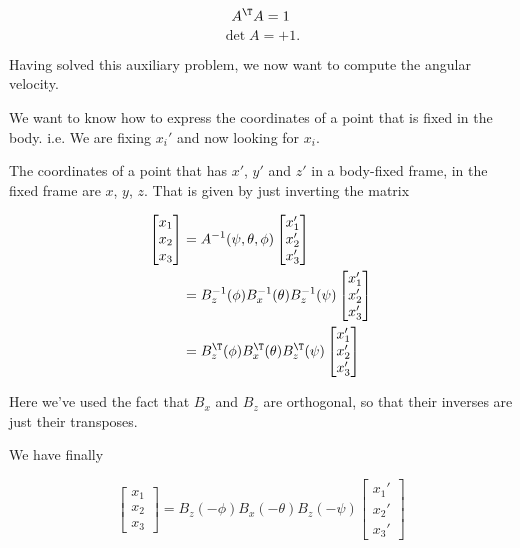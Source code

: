 \begin{equation}\label{eqn:classicalMechanicsEulerAngles:240}
A^\T A = 1
\end{equation}
\begin{equation}\label{eqn:classicalMechanicsEulerAngles:260}
\det A = +1.
\end{equation}

Having solved this auxiliary problem, we now want to compute the angular velocity.

We want to know how to express the coordinates of a point that is fixed in the body.  i.e. We are fixing $x_i'$ and now looking for $x_i$.

The coordinates of a point that has $x'$, $y'$ and $z'$ in a body-fixed frame, in the fixed frame are $x$, $y$, $z$.  That is given by just inverting the matrix

\begin{align*}
\begin{bmatrix}
x_1 \\
x_2 \\
x_3
\end{bmatrix}
&=
A^{-1}(\psi, \theta, \phi)
\begin{bmatrix}
x_1' \\
x_2' \\
x_3'
\end{bmatrix} \\
&=
B_z^{-1}(\phi)
B_x^{-1}(\theta)
B_z^{-1}(\psi)
\begin{bmatrix}
x_1' \\
x_2' \\
x_3'
\end{bmatrix} \\
&=
B_z^{\T}(\phi)
B_x^{\T}(\theta)
B_z^{\T}(\psi)
\begin{bmatrix}
x_1' \\
x_2' \\
x_3'
\end{bmatrix}
\end{align*}

Here we've used the fact that $B_x$ and $B_z$ are orthogonal, so that their inverses are just their transposes.

We have finally

\begin{equation}\label{eqn:classicalMechanicsEulerAngles:280}
\begin{bmatrix}
x_1 \\
x_2 \\
x_3
\end{bmatrix}
=
B_z(-\phi)
B_x(-\theta)
B_z(-\psi)
\begin{bmatrix}
x_1' \\
x_2' \\
x_3'
\end{bmatrix} 
\end{equation}

